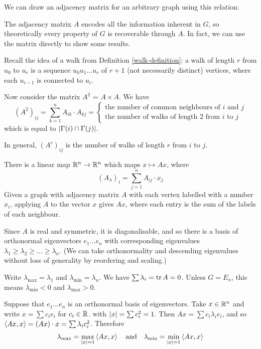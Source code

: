 \documentclass{article}
\begin{document}
\begin{example}
    We can draw an adjacency matrix for an arbitrary graph using this relation:
    
\end{example}

The adjacency matrix $A$ encodes all the information inherent in $G$, so theoretically every property of $G$ is recoverable through $A$. In fact, we can use the matrix directly to show some results.

Recall the idea of a walk from Definition \ref{walk-definition}: a walk of length $r$ from $u_0$ to $u_r$ is a sequence $u_0u_1\dots u_r$ of $r+1$ (not necessarily distinct) vertices, where each $u_{i-1}$ is connected to $u_i$.

Now consider the matrix $A^2$ = $A \times A$. We have
\[
(A^2)_{ij} = \sum_{k=1}^n A_{ik} \cdot A_{kj} = \begin{cases}
	\text{the number of common neighbours of $i$ and $j$} \\
	\text{the number of walks of length 2 from $i$ to $j$}
\end{cases}
\]
which is equal to $\left\lvert \Gamma(i) \cap \Gamma(j) \right\rvert$.

In general, $(A^r)_{ij}$ is the number of walks of length $r$ from $i$ to $j$.

There is a linear map $\mathbb{R}^n \to \mathbb{R}^n$ which maps $x \mapsto Ax$, where
\[
(A_\lambda)_i = \sum_{j = 1}^n A_{ij} \cdot x_j
\]
Given a graph with adjacency matrix $A$ with each vertex labelled with a number $x_i$, applying $A$ to the vector $x$ gives $Ax$, where each entry is the sum of the labels of each neighbour.

Since $A$ is real and symmetric, it is diagonalisable, and so there is a basis of orthonormal eigenvectors $e_1 \dots e_n$ with corresponding eigenvalues $\lambda_1 \geq \lambda_2 \geq \dots \geq \lambda_n$. (We can take orthonormality and descending eigenvalues without loss of generality by reordering and scaling.)

Write $\lambda_\text{max} = \lambda_1$ and $\lambda_\text{min} = \lambda_n$. We have $\sum \lambda_i = \operatorname{tr} A = 0$. Unless $G = E_n$, this means $\lambda_\text{min} < 0$ and $\lambda_\text{max} > 0$.

Suppose that $e_1 \dots e_n$ is an orthonormal basis of eigenvectors. Take $x \in \mathbb{R}^n$ and write $x = \sum c_i e_i$ for $c_i \in \mathbb{R}$. with $\left\lvert x \right\rvert = \sum c_i^2 = 1$. Then $Ax = \sum c_i \lambda_i e_i$, and so $\left\langle Ax, x \right\rangle = (Ax) \cdot x = \sum \lambda_i c_i^2$. Therefore
\[
\lambda_\text{max} = \max_{\left\lvert x \right\rvert = 1} \left\langle Ax, x \right\rangle \quad \text{and} \quad \lambda_\text{min} = \min_{\left\lvert x \right\rvert = 1} \left\langle Ax, x \right\rangle
\]
\end{document}
